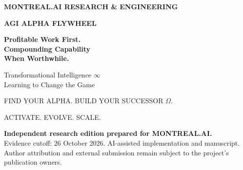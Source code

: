 \documentclass[11pt,letterpaper]{article}
\begin{document}
\hypersetup{pageanchor=false}
\begin{titlepage}
\color{ink}
{\small\bfseries MONTREAL.AI \hfill RESEARCH \& ENGINEERING}\par
\vspace{0.9cm}
{\Large\bfseries AGI ALPHA FLYWHEEL}\par
\vspace{0.5cm}
{\fontsize{31}{37}\selectfont\bfseries Profitable Work First.\\Compounding Capability\\When Worthwhile.\par}
\vspace{0.45cm}
{\Large Transformational Intelligence $\infty$\\Learning to Change the Game\par}
\vspace{0.35cm}
{\large FIND YOUR ALPHA. BUILD YOUR SUCCESSOR $\Omega$.}\par
{\small ACTIVATE. EVOLVE. SCALE.}\par
\vspace{0.45cm}
\color{black}
\textbf{Independent research edition prepared for MONTREAL.AI.}\\
Evidence cutoff: 26 October 2026. AI-assisted implementation and manuscript.\\
Author attribution and external submission remain subject to the project's publication owners.
\vspace{0.35cm}
\begin{abstract}
Can expertly used frontier AI deliver useful accepted work at a complete cost
below a selling price referenced to equivalent human services? We study a
coordination-mechanism foundry using an executable finite-cash model, documented
API prices, human-team service-rate anchors and explicit workload and market
assumptions. Across 64 fresh worlds per scenario, competent Beta-only delivery
produces mean collected operating surplus of USD0.41, 3.70 and 6.76 million in
conservative, central and favorable conditions over 104 weeks plus run-off.
Initial seed capital is USD60,000 and is excluded from profit. The tested policies
charge an average 29.8\%, a fixed 55\% and a fixed 75\% of the respective human
reference. No separate R\&D is selected. Profitable Beta operation is therefore
a positive conditional commercial result, independent of any skill improvement.
Optional retention, sharing and investment are evaluated separately with three
nonoverlapping cost books. Their primary enterprise increment is unestablished;

\end{abstract}
\end{titlepage}
\end{document}

